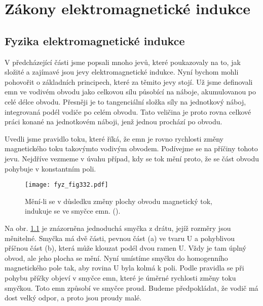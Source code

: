\setchaptertoc
\chapter{Zákony elektromagnetické indukce}\label{fyz:IIchapXVII}


\section{Fyzika elektromagnetické indukce}\label{fyz:IIchapXVIIsecI}
  V předcházející části jsme popsali mnoho jevů, které poukazovaly na to, jak složité a zajímavé 
  jsou jevy elektromagnetické indukce. Nyní bychom mohli pohovořit o základních principech, které 
  za těmito jevy stojí. Už jsme definovali emn ve vodivém obvodu jako celkovou sílu působící na 
  náboje, akumulovanou po celé délce obvodu. Přesněji je to tangenciální složka síly na jednotkový 
  náboj, integrovaná podél vodiče po celém obvodu. Tato veličina je proto rovna celkové práci 
  konané na jednotkovém náboji, jenž jednou prochází po obvodu.
  
  Uvedli jsme pravidlo toku, které říká, že emn je rovno rychlosti změny magnetického toku 
  takovýmto vodivým obvodem. Podívejme se na příčiny tohoto jevu. Nejdříve vezmeme v úvahu případ, 
  kdy se tok mění proto, že se část obvodu pohybuje v konstantním poli.

  \begin{figure}[ht!]  %
    \centering
    \texttt{[image: fyz\_fig332.pdf]}
    \caption{Mění-li se v důsledku změny plochy obvodu magnetický tok, indukuje se ve smyčce emn. 
             (\cite[s.~294]{Feynman02}).}
    \label{fyz:fig332}
  \end{figure}
  
  Na obr. \ref{fyz:fig332} je znázorněna jednoduchá smyčka z drátu, jejíž rozměry jsou měnitelné. 
  Smyčka má dvě části, pevnou část (a) ve tvaru U a pohyblivou příčnou část (b), která může klouzat 
  podél dvou ramen U. Vždy je tam úplný obvod, ale jeho plocha se mění. Nyní umístíme smyčku do 
  homogenního magnetického pole tak, aby rovina U byla kolmá k poli. Podle pravidla se při pohybu 
  příčky objeví v smyčce emn, které je úměrné rychlosti změny toku smyčkou. Toto emn způsobí ve 
  smyčce proud. Budeme předpokládat, že vodič má dost velký odpor, a proto jsou proudy malé.
  
